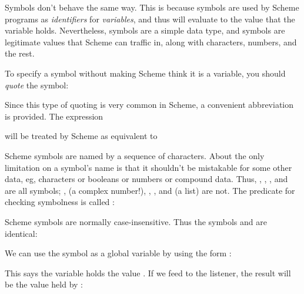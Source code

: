 {


\n Symbols don't behave the same way.  This is because symbols
are used by Scheme programs as {\em identifiers} for {\em
variables}, and thus will evaluate to the value that the
variable holds.  Nevertheless, symbols are a simple data
type, and symbols are legitimate values that Scheme can
traffic in, along with characters, numbers, and the rest.


To specify a symbol without making Scheme think it is a
variable, you should {\em quote} the symbol:




Since this type of quoting is very common in Scheme, a
convenient abbreviation is provided.  The expression


\n will be treated by Scheme as equivalent to



\n Scheme symbols are named by a sequence of characters.  About
the only limitation on a symbol's name is that it shouldn't
be mistakable for some other data, eg, characters or booleans
or numbers or compound data.  Thus, ,
,
\q{<=>}, and \q{$!#*} are all symbols; ,  (a
complex number!), %
, , and
 (a list) are not.    The predicate for
checking symbolness is called :



\n Scheme symbols are normally case-insensitive.  Thus the
symbols
 and  are identical:



\n We can use the symbol  as a global variable by using
the form :


\n This says the variable  holds the value .  If we
feed  to the listener, the result will be the value
held by :

}
